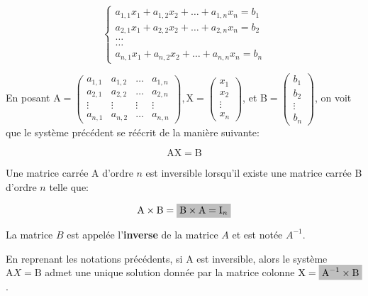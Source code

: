 \documentclass[12pt]{article}
\newcommand{\hideM}[1]{\mbox{\vphantom{$#1$}\smash{\colorbox{gray!50}{$\displaystyle #1$}}} }
\theoremstyle{break}
\begin{document}
$$
\left\{\begin{array}{c}
a_{1,1} x_{1}+a_{1,2} x_{2}+\ldots+a_{1, n} x_{n}=b_{1} \\
a_{2,1} x_{1}+a_{2,2} x_{2}+\ldots+a_{2, n} x_{n}=b_{2} \\
\ldots \\
\ldots \\
a_{n, 1} x_{1}+a_{n, 2} x_{2}+\ldots+a_{n, n} x_{n}=b_{n}
\end{array}\right.
$$

En posant $\mathrm{A}=\left(\begin{array}{cccc}a_{1,1} & a_{1,2} & \ldots & a_{1, n} \\ a_{2,1} & a_{2,2} & \ldots & a_{2, n} \\ \vdots & \vdots & \vdots & \vdots \\ a_{n, 1} & a_{n, 2} & \ldots & a_{n, n}\end{array}\right), \mathrm{X}=\left(\begin{array}{c}x_{1} \\ x_{2} \\ \vdots \\ x_{n}\end{array}\right)$, et $\mathrm{B}=\left(\begin{array}{c}b_{1} \\ b_{2} \\ \vdots \\ b_{n}\end{array}\right)$, on voit que le système précédent se réécrit de la manière suivante:

$$
\mathrm{AX}=\mathrm{B}
$$

\begin{definition}{}{}
Une matrice carrée A d'ordre $n$ est inversible lorsqu'il existe une matrice carrée B d'ordre $n$ telle que:

$$
\mathrm{A} \times \mathrm{B}=\hideM{\mathrm{B} \times \mathrm{A}=\mathrm{I}_{n}}
$$

La matrice $B$ est appelée l'\textbf{inverse} de la matrice $A$ et est notée $A^{-1}$.
\end{definition}

\begin{proposition}{}{}
En reprenant les notations précédents, si A est inversible, alors le système $\mathrm{A} X=\mathrm{B}$ admet une unique solution donnée par la matrice colonne $\mathrm{X}=\hideM{\mathrm{A}^{-1} \times \mathrm{B}}$.
\end{proposition}
\end{document}
